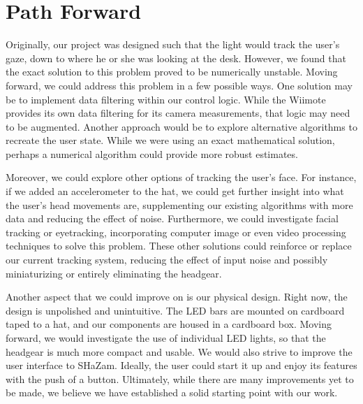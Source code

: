 \documentclass[conference, twocolumn]{IEEEtran}
\begin{document}
\section{Path Forward}
Originally, our project was designed such that the light would track the user's gaze, down to where he or she was looking at the desk. However, we found that the exact solution to this problem proved to be numerically unstable. Moving forward, we could address this problem in a few possible ways. One solution may be to implement data filtering within our control logic. While the Wiimote provides its own data filtering for its camera measurements, that logic may need to be augmented. Another approach would be to explore alternative algorithms to recreate the user state. While we were using an exact mathematical solution, perhaps a numerical algorithm could provide more robust estimates.

Moreover, we could explore other options of tracking the user's face. For instance, if we added an accelerometer to the hat, we could get further insight into what the user's head movements are, supplementing our existing algorithms with more data and reducing the effect of noise. Furthermore, we could investigate facial tracking or eyetracking, incorporating computer image or even video processing techniques to solve this problem. These other solutions could reinforce or replace our current tracking system, reducing the effect of input noise and possibly miniaturizing or entirely eliminating the headgear.

Another aspect that we could improve on is our physical design. Right now, the design is unpolished and unintuitive. The LED bars are mounted on cardboard taped to a hat, and our components are housed in a cardboard box. Moving forward, we would investigate the use of individual LED lights, so that the headgear is much more compact and usable. We would also strive to improve the user interface to SHaZam. Ideally, the user could start it up and enjoy its features with the push of a button. Ultimately, while there are many improvements yet to be made, we believe we have established a solid starting point with our work.


% 
%
%
%
\end{document}
